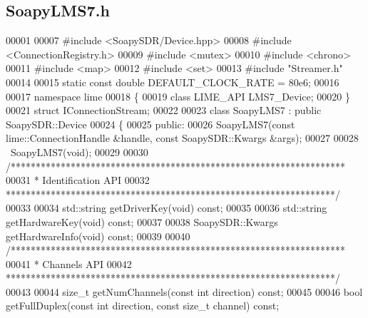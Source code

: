 \subsection{Soapy\+L\+M\+S7.\+h}
\label{SoapyLMS7_8h_source}

\begin{DoxyCode}
00001 
00007 \textcolor{preprocessor}{#include <SoapySDR/Device.hpp>}
00008 \textcolor{preprocessor}{#include <ConnectionRegistry.h>}
00009 \textcolor{preprocessor}{#include <mutex>}
00010 \textcolor{preprocessor}{#include <chrono>}
00011 \textcolor{preprocessor}{#include <map>}
00012 \textcolor{preprocessor}{#include <set>}
00013 \textcolor{preprocessor}{#include "Streamer.h"}
00014 
00015 \textcolor{keyword}{static} \textcolor{keyword}{const} \textcolor{keywordtype}{double} DEFAULT_CLOCK_RATE = 80e6;
00016 
00017 \textcolor{keyword}{namespace }lime
00018 \{
00019     \textcolor{keyword}{class }LIME_API LMS7_Device;
00020 \}
00021 \textcolor{keyword}{struct }IConnectionStream;
00022 
00023 \textcolor{keyword}{class }SoapyLMS7 : \textcolor{keyword}{public} SoapySDR::Device
00024 \{
00025 \textcolor{keyword}{public}:
00026     SoapyLMS7(\textcolor{keyword}{const} lime::ConnectionHandle &handle, \textcolor{keyword}{const} SoapySDR::Kwargs &args);
00027 
00028     ~SoapyLMS7(\textcolor{keywordtype}{void});
00029 
00030     \textcolor{comment}{/*******************************************************************}
00031 \textcolor{comment}{     * Identification API}
00032 \textcolor{comment}{     ******************************************************************/}
00033 
00034     std::string getDriverKey(\textcolor{keywordtype}{void}) \textcolor{keyword}{const};
00035 
00036     std::string getHardwareKey(\textcolor{keywordtype}{void}) \textcolor{keyword}{const};
00037 
00038     SoapySDR::Kwargs getHardwareInfo(\textcolor{keywordtype}{void}) \textcolor{keyword}{const};
00039 
00040     \textcolor{comment}{/*******************************************************************}
00041 \textcolor{comment}{     * Channels API}
00042 \textcolor{comment}{     ******************************************************************/}
00043 
00044     \textcolor{keywordtype}{size\_t} getNumChannels(\textcolor{keyword}{const} \textcolor{keywordtype}{int} direction) \textcolor{keyword}{const};
00045 
00046     \textcolor{keywordtype}{bool} getFullDuplex(\textcolor{keyword}{const} \textcolor{keywordtype}{int} direction, \textcolor{keyword}{const} \textcolor{keywordtype}{size\_t} channel) \textcolor{keyword}{const};

\end{DoxyCode}
